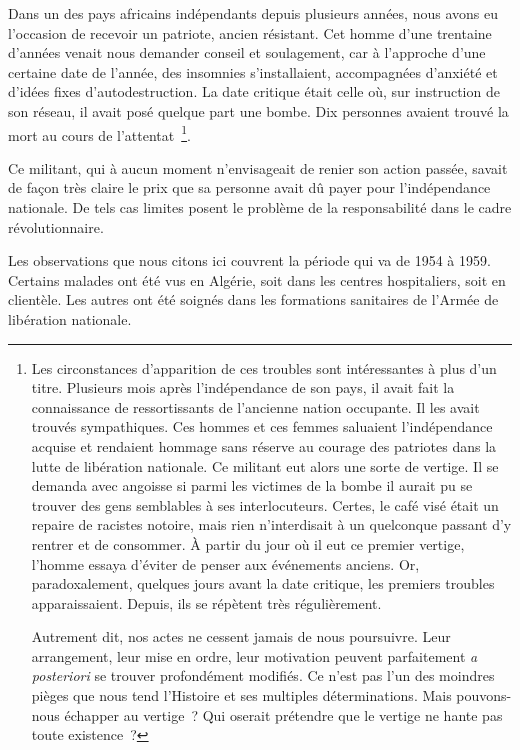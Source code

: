 \documentclass[french,twoside]{book} %
\begin{document}
Dans un des pays africains indépendants depuis plusieurs années, nous avons eu l’occasion de recevoir un patriote, ancien résistant. Cet homme d’une trentaine d’années venait nous demander conseil et soulagement, car à l’approche d’une certaine date de l’année, des insomnies s’installaient, accompagnées d’anxiété et d’idées fixes d’autodestruction. La date critique était celle où, sur instruction de son réseau, il avait posé quelque part une bombe. Dix personnes avaient trouvé la mort au cours de l’attentat \footnote{ \noindent Les circonstances d’apparition de ces troubles sont intéressantes à plus d’un titre. Plusieurs mois après l’indépendance de son pays, il avait fait la connaissance de ressortissants de l’ancienne nation occupante. Il les avait trouvés sympathiques. Ces hommes et ces femmes saluaient l’indépendance acquise et rendaient hommage sans réserve au courage des patriotes dans la lutte de libération nationale. Ce militant eut alors une sorte de vertige. Il se demanda avec angoisse si parmi les victimes de la bombe il aurait pu se trouver des gens semblables à ses interlocuteurs. Certes, le café visé était un repaire de racistes notoire, mais rien n’interdisait à un quelconque passant d’y rentrer et de consommer. À partir du jour où il eut ce premier vertige, l’homme essaya d’éviter de penser aux événements anciens. Or, paradoxalement, quelques jours avant la date critique, les premiers troubles apparaissaient. Depuis, ils se répètent très régulièrement.\par
 Autrement dit, nos actes ne cessent jamais de nous poursuivre. Leur arrangement, leur mise en ordre, leur motivation peuvent parfaitement \emph{a posteriori} se trouver profondément modifiés. Ce n’est pas l’un des moindres pièges que nous tend l’Histoire et ses multiples déterminations. Mais pouvons-nous échapper au vertige ? Qui oserait prétendre que le vertige ne hante pas toute existence ?
}.\par
 Ce militant, qui à aucun moment n’envisageait de renier son action passée, savait de façon très claire le prix que sa personne avait dû payer pour l’indépendance nationale. De tels cas limites posent le problème de la responsabilité dans le cadre révolutionnaire.\par
Les observations que nous citons ici couvrent la période qui va de 1954 à 1959. Certains malades ont été vus en Algérie, soit dans les centres hospitaliers, soit en clientèle. Les autres ont été soignés dans les formations sanitaires de l’Armée de libération nationale.\par
\end{document}
